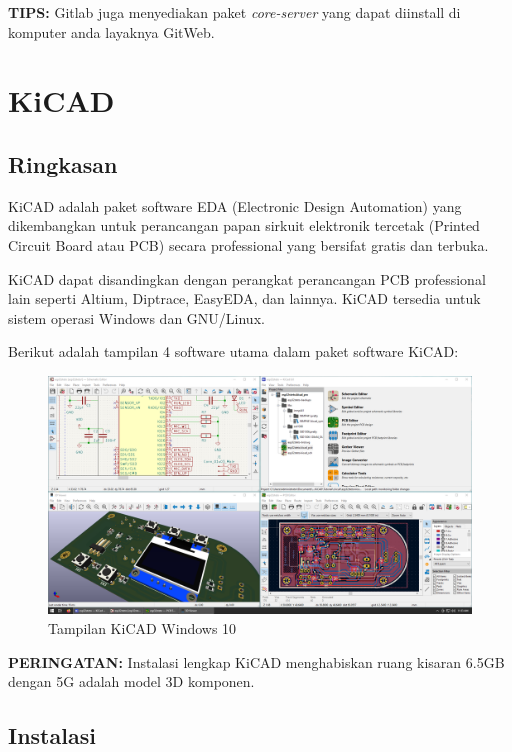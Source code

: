 \documentclass[12pt]{book}
\begin{document}
	\textbf{TIPS:} Gitlab juga menyediakan paket \textit{core-server} yang dapat diinstall di komputer anda layaknya GitWeb.
	
	
	\newpage
	\chapter{KiCAD}
	
	\section{Ringkasan}
	
	KiCAD adalah paket software EDA (Electronic Design Automation) yang dikembangkan untuk perancangan papan sirkuit elektronik tercetak (Printed Circuit Board atau PCB)
	secara professional yang bersifat gratis dan terbuka.
	
	KiCAD dapat disandingkan dengan perangkat perancangan PCB professional lain seperti Altium, Diptrace, EasyEDA, dan lainnya.
	KiCAD tersedia untuk sistem operasi Windows dan GNU/Linux.
	
	Berikut adalah tampilan 4 software utama dalam paket software KiCAD:
	\begin{figure}[!ht]
		\centering
		\includegraphics[width=\textwidth]{images/kicad/kicad_windows10}
		\caption{Tampilan KiCAD Windows 10}
	\end{figure}
	
	\textbf{PERINGATAN:} Instalasi lengkap KiCAD menghabiskan ruang kisaran 6.5GB dengan 5G adalah model 3D komponen.
	
	\newpage
	\section{Instalasi}
	
\end{document}
